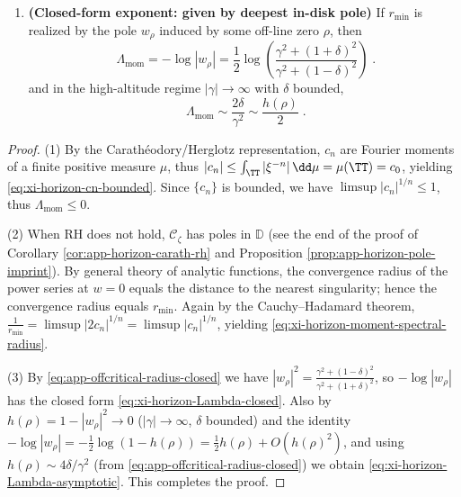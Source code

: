 \begin{theorem}
\begin{enumerate}
\begin{equation}
  \boxed{\;
  \mathfrak{r}_{\mathrm{mom}}=\frac{1}{r_{\min}}>1,
  \qquad
  \Lambda_{\mathrm{mom}}=-\log r_{\min}>0\; }.
  \end{equation}
  \item \textbf{(Closed-form exponent: given by deepest in-disk pole)} If \(r_{\min}\) is realized by the pole \(w_{\rho}\) induced by some off-line zero \(\rho\), then
  \begin{equation}\label{eq:xi-horizon-Lambda-closed}
  \boxed{\;
  \Lambda_{\mathrm{mom}}
  =-\log|w_{\rho}|
  =\frac12\log\!\left(\frac{\gamma^{2}+(1+\delta)^{2}}{\gamma^{2}+(1-\delta)^{2}}\right)\; }.
  \end{equation}
  and in the high-altitude regime \(|\gamma|\to\infty\) with \(\delta\) bounded,
  \begin{equation}\label{eq:xi-horizon-Lambda-asymptotic}
  \boxed{\;
  \Lambda_{\mathrm{mom}}\sim \frac{2\delta}{\gamma^{2}}\sim \frac{h(\rho)}{2}\; }.
  \end{equation}
\end{enumerate}
\end{theorem}

\begin{proof}
(1) By the Carath\'eodory/Herglotz representation, \(c_n\) are Fourier moments of a finite positive measure \(\mu\), thus
\(
|c_n|\le \int_{\TT}|\xi^{-n}|\,\dd\mu=\mu(\TT)=c_0
\),
yielding \eqref{eq:xi-horizon-cn-bounded}.
Since \(\{c_n\}\) is bounded, we have \(\limsup |c_n|^{1/n}\le 1\), thus \(\Lambda_{\mathrm{mom}}\le 0\).
\par
(2) When RH does not hold, \(\mathscr{C}_{\zeta}\) has poles in \(\mathbb{D}\) (see the end of the proof of Corollary \ref{cor:app-horizon-carath-rh} and Proposition \ref{prop:app-horizon-pole-imprint}).
By general theory of analytic functions, the convergence radius of the power series at \(w=0\) equals the distance to the nearest singularity; hence the convergence radius equals \(r_{\min}\).
Again by the Cauchy--Hadamard theorem, \(\frac{1}{r_{\min}}=\limsup |2c_n|^{1/n}=\limsup |c_n|^{1/n}\), yielding \eqref{eq:xi-horizon-moment-spectral-radius}.
\par
(3) By \eqref{eq:app-offcritical-radius-closed} we have
\(
|w_{\rho}|^2=\frac{\gamma^2+(1-\delta)^2}{\gamma^2+(1+\delta)^2}
\),
so \(-\log|w_{\rho}|\) has the closed form \eqref{eq:xi-horizon-Lambda-closed}.
Also by \(h(\rho)=1-|w_{\rho}|^2\to 0\) (\(|\gamma|\to\infty\), \(\delta\) bounded) and the identity
\(
-\log|w_{\rho}|=-\tfrac12\log(1-h(\rho))
=\tfrac12 h(\rho)+O(h(\rho)^2)
\),
and using \(h(\rho)\sim 4\delta/\gamma^2\) (from \eqref{eq:app-offcritical-radius-closed}) we obtain \eqref{eq:xi-horizon-Lambda-asymptotic}. This completes the proof.
\end{proof}

